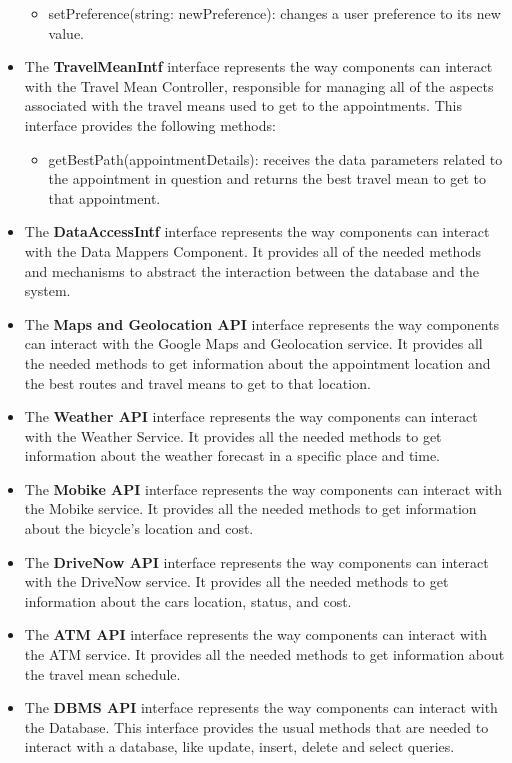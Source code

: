 \documentclass[12pt]{article}
\begin{document}
\begin{itemize}
\begin{itemize}
        \item setPreference(string: newPreference): changes a user preference to its new value.
    \end{itemize}
    \item The \textbf{TravelMeanIntf} interface represents the way components can interact with the Travel Mean Controller, responsible for managing all of the aspects associated with the travel means used to get to the appointments. This interface provides the following methods:
    \begin{itemize}
        \item getBestPath(appointmentDetails): receives the data parameters related to the appointment in question and returns the best travel mean to get to that appointment.
    \end{itemize}
    \item The \textbf{DataAccessIntf} interface represents the way components can interact with the Data Mappers Component. It provides all of the needed methods and mechanisms to abstract the interaction between the database and the system.
    \item The \textbf{Maps and Geolocation API} interface represents the way components can interact with the Google Maps and Geolocation service. It provides all the needed methods to get information about the appointment location and the best routes and travel means to get to that location.
    \item The \textbf{Weather API} interface represents the way components can interact with the Weather Service. It provides all the needed methods to get information about the weather forecast in a specific place and time.
    \item The \textbf{Mobike API} interface represents the way components can interact with the Mobike service. It provides all the needed methods to get information about the bicycle's location and cost.
    \item The \textbf{DriveNow API} interface represents the way components can interact with the DriveNow service. It provides all the needed methods to get information about the cars location, status, and cost.
    \item The \textbf{ATM API} interface represents the way components can interact with the ATM service. It provides all the needed methods to get information about the travel mean schedule.
    \item The \textbf{DBMS API} interface represents the way components can interact with the Database. This interface provides the usual methods that are needed to interact with a database, like update, insert, delete and select queries.
\end{itemize}
\end{document}
